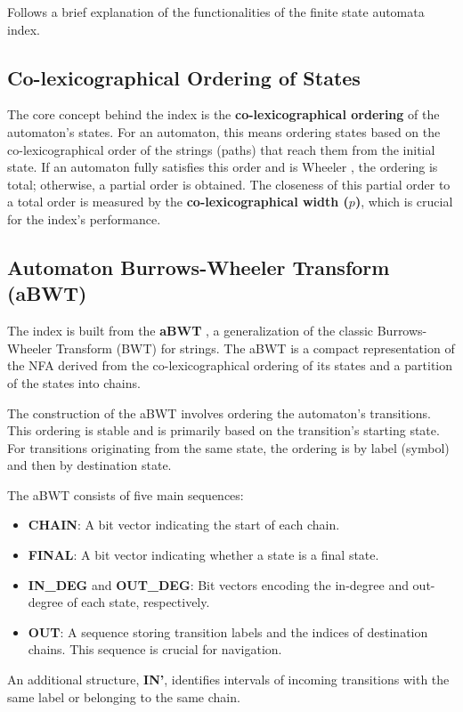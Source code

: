 Follows a brief explanation of the functionalities of the finite state automata index.

\subsection{Co-lexicographical Ordering of States}
The core concept behind the index is the \textbf{co-lexicographical ordering} of the automaton's states. For an automaton, this means ordering states based on the co-lexicographical order of the strings (paths) that reach them from the initial state. If an automaton fully satisfies this order and is Wheeler \cite{gagie2017wheeler}, the ordering is total; otherwise, a partial order is obtained. The closeness of this partial order to a total order is measured by the \textbf{co-lexicographical width ($p$)}, which is crucial for the index's performance.

\subsection{Automaton Burrows-Wheeler Transform (aBWT)}
The index is built from the \textbf{aBWT} \cite{cotumaccio2023co}, a generalization of the classic Burrows-Wheeler Transform (BWT) for strings. The aBWT is a compact representation of the NFA derived from the co-lexicographical ordering of its states and a partition of the states into chains.

The construction of the aBWT involves ordering the automaton's transitions. This ordering is stable and is primarily based on the transition's starting state. For transitions originating from the same state, the ordering is by label (symbol) and then by destination state.

The aBWT consists of five main sequences:
\begin{itemize}
    \item \textbf{CHAIN}: A bit vector indicating the start of each chain.
    \item \textbf{FINAL}: A bit vector indicating whether a state is a final state.
    \item \textbf{IN\_DEG} and \textbf{OUT\_DEG}: Bit vectors encoding the in-degree and out-degree of each state, respectively.
    \item \textbf{OUT}: A sequence storing transition labels and the indices of destination chains. This sequence is crucial for navigation.
\end{itemize}
An additional structure, \textbf{IN'}, identifies intervals of incoming transitions with the same label or belonging to the same chain.

